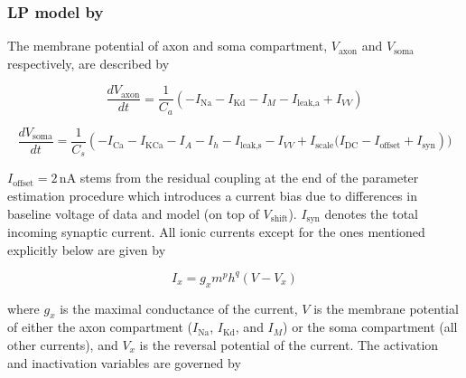 \subsubsection{LP model by \cite{nowotny_probing_2008}}

The membrane potential of axon and soma compartment, $V_{\text{axon}}$ and $V_{\text{soma}}$ respectively, are described by

\begin{equation}
	\frac{dV_{\text{axon}}}{dt} = \frac{1}{C_a} \left( -I_{\text{Na}} - I_{\text{Kd}} - I_M - I_{\text{leak,a}} + I_{VV} \right)
\end{equation}

\begin{equation}
	\frac{dV_{\text{soma}}}{dt} = \frac{1}{C_s} \left( -I_{\text{Ca}} - I_{\text{KCa}} - I_A - I_h - I_{\text{leak,s}} - I_{VV} + I_{\text{scale}} (I_{\text{DC}} - I_{\text{offset}} + I_{\text{syn}} \right))
\end{equation}

$I_{\text{offset}} = 2 \, \text{nA}$ stems from the residual coupling at the end of the parameter estimation procedure which introduces a current bias due to differences in baseline voltage of data and model (on top of $V_{\text{shift}}$). $I_{\text{syn}}$ denotes the total incoming synaptic current. All ionic currents except for the ones mentioned explicitly below are given by

\begin{equation}
	I_x = g_x m^p h^q (V - V_x)
\end{equation}

where $g_x$ is the maximal conductance of the current, $V$ is the membrane potential of either the axon compartment ($I_{\text{Na}}$, $I_{\text{Kd}}$, and $I_M$) or the soma compartment (all other currents), and $V_x$ is the reversal potential of the current. The activation and inactivation variables are governed by

%
%
%

